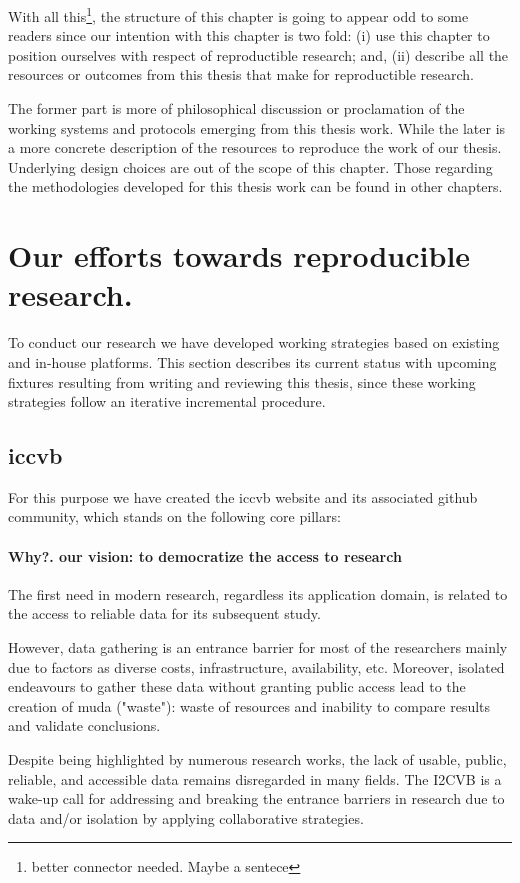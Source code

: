 With all this\footnote{better connector needed. Maybe a sentece}, the structure
of this chapter is going to appear odd to some readers since our intention with
this  chapter is two fold:
(i) use this chapter to position ourselves with respect of reproductible
research;
and, (ii) describe all the resources or outcomes from this thesis that make for
reproductible research.

The former part is more of philosophical discussion or proclamation of the
working systems and protocols emerging from this thesis work. While the later is
a more concrete description of the resources to reproduce the work of our
thesis. Underlying design choices are out of the scope of this chapter. Those
regarding the methodologies developed for this thesis work can be found in other chapters.

\section{Our efforts towards reproducible research.}
To conduct our research we have developed working strategies based on existing
and in-house platforms. This section describes its current status with upcoming
fixtures resulting from writing and reviewing this thesis, since these working
strategies follow an iterative incremental procedure.

\subsection{\acs{iccvb}}
For this purpose we have created the \acs{iccvb} website and its associated
github community, which stands on the following core pillars:

\paragraph{Why?. our vision: to democratize the access to research}
The first need in modern research, regardless its application domain, is related to the access to reliable data for its subsequent study.

However, data gathering is an entrance barrier for most of the researchers mainly due to factors as diverse costs, infrastructure, availability, etc. Moreover, isolated endeavours to gather these data without granting public access lead to the creation of muda ("waste"): waste of resources and inability to compare results and validate conclusions.

Despite being highlighted by numerous research works, the lack of usable, public, reliable, and accessible data remains disregarded in many fields. The I2CVB is a wake-up call for addressing and breaking the entrance barriers in research due to data and/or isolation by applying collaborative strategies.


